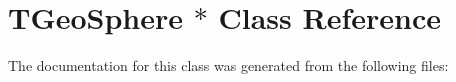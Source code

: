 \hypertarget{class_t_geo_sphere_01_5}{
\section{TGeoSphere $\ast$ Class Reference}
\label{class_t_geo_sphere_01_5}
}


The documentation for this class was generated from the following files: